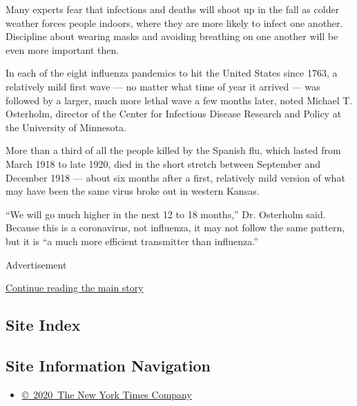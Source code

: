 Many experts fear that infections and deaths will shoot up in the fall
as colder weather forces people indoors, where they are more likely to
infect one another. Discipline about wearing masks and avoiding
breathing on one another will be even more important then.

In each of the eight influenza pandemics to hit the United States since
1763, a relatively mild first wave --- no matter what time of year it
arrived --- was followed by a larger, much more lethal wave a few months
later, noted Michael T. Osterholm, director of the Center for Infectious
Disease Research and Policy at the University of Minnesota.

More than a third of all the people killed by the Spanish flu, which
lasted from March 1918 to late 1920, died in the short stretch between
September and December 1918 --- about six months after a first,
relatively mild version of what may have been the same virus broke out
in western Kansas.

``We will go much higher in the next 12 to 18 months,'' Dr. Osterholm
said. Because this is a coronavirus, not influenza, it may not follow
the same pattern, but it is ``a much more efficient transmitter than
influenza.''

Advertisement

\protect\hyperlink{after-bottom}{Continue reading the main story}

\hypertarget{site-index}{%
\subsection{Site Index}\label{site-index}}

\hypertarget{site-information-navigation}{%
\subsection{Site Information
Navigation}\label{site-information-navigation}}

\begin{itemize}
\tightlist
\item
  \href{https://help.nytimes.com/hc/en-us/articles/115014792127-Copyright-notice}{©~2020~The
  New York Times Company}
\end{itemize}

